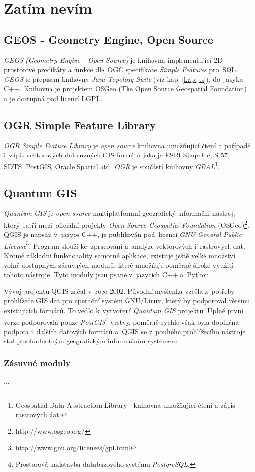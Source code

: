 \chapter{Zatím nevím}
\label{4-nevim}

\section{GEOS - Geometry Engine, Open Source}
\label{geos}

\textit{GEOS (Geometry Engine - Open Source)} je knihovna implementující 2D 
prostorové predikáty a funkce dle~OGC specifikace \textit{Simple Features} 
pro~SQL. \textit{GEOS} je přepisem knihovny \textit{Java Topology Suite} 
(viz kap. \ref{kap:jts}), do~jazyka C++. Knihovna je projektem OSGeo 
(The Open Source Geospatial Foundation) a je dostupná pod licencí LGPL.

\section{OGR Simple Feature Library}
\label{ogr}

\textit{OGR Simple Feature Library} je \textit{open source} knihovna umožňující
čtení a pořípadě i~zápis vektorových dat různých GIS formátů jako je ESRI 
Shapefile, S-57, SDTS, PostGIS, Oracle Spatial atd. \textit{OGR} je součástí 
knihovny \textit{GDAL}\footnote{Geospatial Data Abstraction Library - knihovna
umožňující čtení a zápis rastrových dat.}.

\section{Quantum GIS}
\label{qgis}

\textit{Quantum GIS} je \textit{open source} multiplatformní geografický 
informační nástroj, který patří mezi~oficiální projekty \textit{Open Source 
Geospatial Foundation} (OSGeo)\footnote{http://www.osgeo.org/}. QGIS je 
napsán v~jazyce C++, je publikován pod~licencí \textit{GNU General Public 
License}\footnote{http://www.gnu.org/licenses/gpl.html}. Program slouží 
ke~zpracování a~analýze vektorových i~rastrových dat. Kromě základní 
funkcionality samotné aplikace, existuje ještě velké množství volně 
dostupných zásuvných modulů, které umožňují poměrně široké využití 
tohoto nástroje. Tyto moduly jsou psané v~jazycích C++ a~Python.

Vývoj projektu QGIS začal v~roce 2002. Původní myšlenka vzešla z~potřeby 
prohlížeče GIS dat pro operační systém GNU/Linux, který by podporoval většinu 
existujících formátů. To vedlo k~vytvoření \textit{Quantum GIS} projektu. Úplně 
první verze podporovala pouze \textit{PostGIS}\footnote{Prostorová nadstavba 
databázového systému \textit{PostgreSQL}.} vrstvy, poměrně rychle však byla 
doplněna podpora i~dalších datových formátů a~QGIS se z~pouhého prohlížecího 
nástroje stal plnohodnotným geografickým informačním systémem.


\subsection{Zásuvné moduly}
\label{qgis plugins}
...
